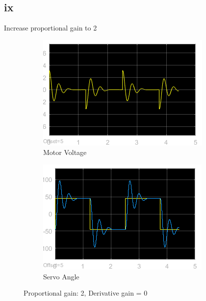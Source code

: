\documentclass[12pt]{article}
\begin{document}
\subsection*{ix} %
Increase proportional gain to 2
\begin{figure}[h!]
    \centering
    \begin{subfigure}[b]{0.49\textwidth}
        \includegraphics[width=\textwidth]{ix_voltage}
        \caption{Motor Voltage}
    \end{subfigure}
    \begin{subfigure}[b]{0.49\textwidth}
        \includegraphics[width=\textwidth]{ix_angle}
        \caption{Servo Angle}
    \end{subfigure}
    \caption{\label{fig:ix} Proportional gain: 2, Derivative gain = 0}
\end{figure}
\end{document}
